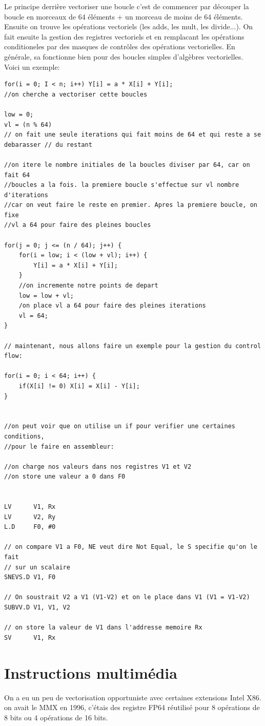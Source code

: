 \documentclass[oneside]{book}
\begin{document}
Le principe derrière vectoriser une boucle c'est de commencer par découper la boucle en morceaux de 64 éléments + un morceau de moins de 64 éléments. Ensuite on trouve les opérations vectoriels (les adds, les mult, les divide...). On fait ensuite la gestion des registres vectoriels et en remplacant les opérations conditioneles par des masques de contrôles des opérations vectorielles. En générale, sa fonctionne bien pour des boucles simples d'algèbres vectorielles.\\

Voici un exemple:
\begin{lstlisting}
for(i = 0; I < n; i++) Y[i] = a * X[i] + Y[i];
//on cherche a vectoriser cette boucles

low = 0;
vl = (n % 64)
// on fait une seule iterations qui fait moins de 64 et qui reste a se debarasser // du restant

//on itere le nombre initiales de la boucles diviser par 64, car on fait 64
//boucles a la fois. la premiere boucle s'effectue sur vl nombre d'iterations 
//car on veut faire le reste en premier. Apres la premiere boucle, on fixe 
//vl a 64 pour faire des pleines boucles

for(j = 0; j <= (n / 64); j++) {
	for(i = low; i < (low + vl); i++) {
		Y[i] = a * X[i] + Y[i];
	}
	//on incremente notre points de depart
	low = low + vl;
	/on place vl a 64 pour faire des pleines iterations
	vl = 64;
}

// maintenant, nous allons faire un exemple pour la gestion du control flow:

for(i = 0; i < 64; i++) {
	if(X[i] != 0) X[i] = X[i] - Y[i];
}


//on peut voir que on utilise un if pour verifier une certaines conditions, 
//pour le faire en assembleur:

//on charge nos valeurs dans nos registres V1 et V2 
//on store une valeur a 0 dans F0


LV		V1, Rx
LV		V2, Ry
L.D		F0, #0

// on compare V1 a F0, NE veut dire Not Equal, le S specifie qu'on le fait 
// sur un scalaire
SNEVS.D	V1, F0

// On soustrait V2 a V1 (V1-V2) et on le place dans V1 (V1 = V1-V2)
SUBVV.D	V1, V1, V2

// on store la valeur de V1 dans l'addresse memoire Rx
SV		V1, Rx

\end{lstlisting}

\section{Instructions multimédia}
On a eu un peu de vectorisation opportuniste avec certaines extensions Intel X86. on avait le MMX en 1996, c'étais des registre FP64 réutilisé pour 8 opérations de 8 bits ou 4 opérations de 16 bits.\\
\end{document}
